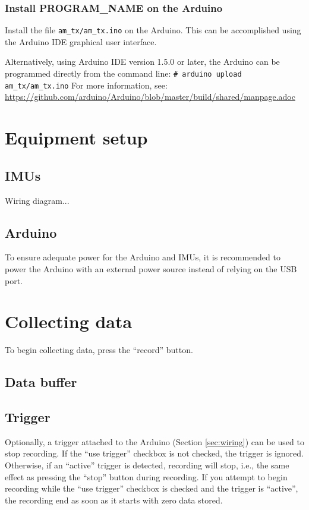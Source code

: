 \documentclass[11pt,letterpaper,article]{memoir}
\newcommand{\name}{PROGRAM_NAME}
\begin{document}
\subsubsection{Install \name{} on the Arduino}
\label{sec:installarduinocode}

Install the file \texttt{am\_tx/am\_tx.ino} on the Arduino.
This can be accomplished using the Arduino IDE graphical user interface.

Alternatively, using Arduino IDE version 1.5.0 or later,
the Arduino can be programmed directly from the command line:
\texttt{\# arduino upload am\_tx/am\_tx.ino}
For more information, see:
\href{https://github.com/arduino/Arduino/blob/master/build/shared/manpage.adoc}
{https://github.com/arduino/Arduino/blob/master/build/shared/manpage.adoc}

\section{Equipment setup}

\subsection{IMUs}
Wiring diagram...

\subsection{Arduino}
To ensure adequate power for the Arduino and IMUs, it is recommended to power
the Arduino with an external power source instead of relying on the USB port.

\section{Collecting data}

To begin collecting data, press the ``record'' button.


\subsection{Data buffer}


\subsection{Trigger}

Optionally, a trigger attached to the Arduino (Section \ref{sec:wiring}) can be
used to stop recording.  If the ``use trigger'' checkbox is not checked, the
trigger is ignored. Otherwise, if an ``active'' trigger is detected, recording
will stop, i.e., the same effect as pressing the ``stop'' button during
recording. If you attempt to begin recording while the ``use trigger'' checkbox
is checked and the trigger is ``active'', the recording end as soon as it starts
with zero data stored.
\end{document}
